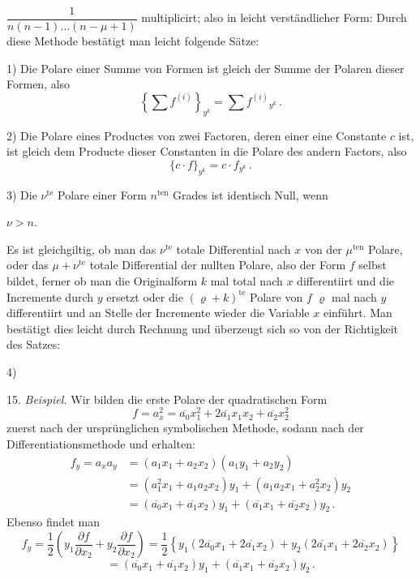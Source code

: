 
$\dfrac{1}{n(n-1)\ldots(n-\mu+1)}$ multiplicirt\grqq{}; also in leicht verständlicher Form:
Durch diese Methode bestätigt man leicht folgende Sätze:

1) Die Polare einer Summe von Formen ist gleich der Summe der Polaren dieser Formen, also
\[ \left\{\sum f^{(i)}\right\}_{y^k} = \sum f^{(i)}{}_{y^k}\,. \]

2) Die Polare eines Productes von zwei Factoren, deren einer eine Constante $c$ ist, ist gleich dem Producte dieser Constanten in die Polare des andern Factors, also
\[ \{c\cdot f\}_{y^k} = c\cdot f_{y^k}\,. \]

3) Die $\nu^{\text{te}}$ Polare einer Form $n^{\text{ten}}$ Grades ist identisch Null, wenn

$\nu>n$.

Es ist gleichgiltig, ob man das $\nu^{\text{te}}$ totale Differential nach $x$ von der $\mu^{\text{ten}}$ Polare, oder das $\mu+\nu^{\text{te}}$ totale Differential der nullten Polare, also der Form $f$ selbst bildet, ferner ob man die Originalform $k$ mal total nach $x$ differentiirt und die Incremente durch $y$ ersetzt oder die $(\varrho+k)^{\text{te}}$ Polare von $f$ $\varrho$ mal nach $y$ differentiirt und an Stelle der Incremente wieder die Variable $x$ einführt. Man bestätigt dies leicht durch Rechnung und überzeugt sich so von der Richtigkeit des Satzes:

4) 

15. \textit{Beispiel.} Wir bilden die erste Polare der quadratischen Form
\[ f = a_x^2 = \overline{a_0}x_1^2+2\overline{a_1}x_1x_2+\overline{a_2}x_2^2 \]
zuerst nach der ursprünglichen symbolischen Methode, sodann nach der Differentiationsmethode und erhalten:
\[
\begin{aligned}
f_y = a_xa_y &= (a_1x_1+a_2x_2)(a_1y_1+a_2y_2)\\
&= (a_1^2x_1+a_1a_2x_2)y_1+(a_1a_2x_1+a_2^2x_2)y_2\\
&= (\overline{a_0}x_1+\overline{a_1}x_2)y_1+(\overline{a_1}x_1+\overline{a_2}x_2)y_2\,.
\end{aligned}
\]
Ebenso findet man
\[
f_y = \frac{1}{2}\left(y_1\frac{\partial f}{\partial x_2}+y_2\frac{\partial f}{\partial x_2}\right) = \frac{1}{2}\left\{y_1(2\overline{a_0}x_1+2\overline{a_1}x_2)+y_2(2\overline{a_1}x_1+2\overline{a_2}x_2)\right\}
\]
\[ = (\overline{a_0}x_1+\overline{a_1}x_2)y_1+(\overline{a_1}x_1+\overline{a_2}x_2)y_2\,. \]

